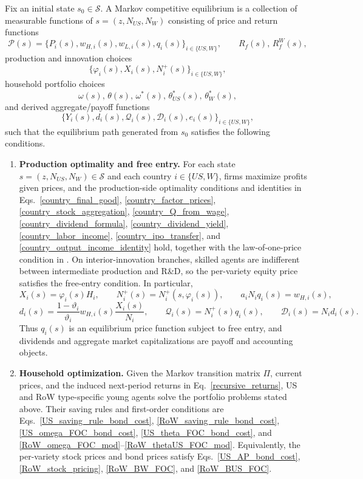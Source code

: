 \documentclass{article}
\begin{document}
\begin{defi}\label{def_recursive_equilibrium}
Fix an initial state $s_0\in\mathcal S$. A Markov competitive equilibrium is a collection of measurable functions of $s=(z,N_{US},N_W)$ consisting of price and return functions
\[
\mathcal P(s)=
\{P_i(s),w_{H,i}(s),w_{L,i}(s),q_i(s)\}_{i\in\{US,W\}},
\qquad
R_f(s),\,R_f^W(s),
\]
production and innovation choices
\[
\{\varphi_i(s),X_i(s),N_i^+(s)\}_{i\in\{US,W\}},
\]
household portfolio choices
\[
\omega(s),\,\theta(s),\,\omega^*(s),\,\theta_{US}^*(s),\,\theta_W^*(s),
\]
and derived aggregate/payoff functions
\[
\{Y_i(s),d_i(s),\mathcal Q_i(s),\mathcal D_i(s),e_i(s)\}_{i\in\{US,W\}},
\]
such that the equilibrium path generated from $s_0$ satisfies the following conditions.

\begin{enumerate}
    \item \textbf{Production optimality and free entry.} For each state $s=(z,N_{US},N_W)\in\mathcal S$ and each country $i\in\{US,W\}$, firms maximize profits given prices, and the production-side optimality conditions and identities in Eqs.~\eqref{country_final_good}, \eqref{country_factor_prices}, \eqref{country_stock_aggregation}, \eqref{country_Q_from_wage}, \eqref{country_dividend_formula}, \eqref{country_dividend_yield}, \eqref{country_labor_income}, \eqref{country_ipo_transfer}, and \eqref{country_output_income_identity} hold, together with the law-of-one-price condition in . On interior-innovation branches, skilled agents are indifferent between intermediate production and R\&D, so the per-variety equity price satisfies the free-entry condition. In particular,
    \[
    X_i(s)=\varphi_i(s)H_i,
    \qquad
    N_i^+(s)=N_i^+(s,\varphi_i(s)),
    \qquad
    a_iN_iq_i(s)=w_{H,i}(s),
    \]
    \[
    d_i(s)=
    \frac{1-\vartheta_i}{\vartheta_i}
    w_{H,i}(s)\frac{X_i(s)}{N_i},
    \qquad
    \mathcal Q_i(s)=N_i^+(s)q_i(s),
    \qquad
    \mathcal D_i(s)=N_id_i(s).
    \]
    Thus $q_i(s)$ is an equilibrium price function subject to free entry, and dividends and aggregate market capitalizations are payoff and accounting objects.

    \item \textbf{Household optimization.} Given the Markov transition matrix $\Pi$, current prices, and the induced next-period returns in Eq.~\eqref{recursive_returns}, US and RoW type-specific young agents solve the portfolio problems stated above. Their saving rules and first-order conditions are Eqs.~\eqref{US_saving_rule_bond_cost}, \eqref{RoW_saving_rule_bond_cost}, \eqref{US_omega_FOC_bond_cost}, \eqref{US_theta_FOC_bond_cost}, and \eqref{RoW_omega_FOC_mod}--\eqref{RoW_thetaUS_FOC_mod}. Equivalently, the per-variety stock prices and bond prices satisfy Eqs.~\eqref{US_AP_bond_cost}, \eqref{RoW_stock_pricing}, \eqref{RoW_BW_FOC}, and \eqref{RoW_BUS_FOC}.


\end{enumerate}
\end{defi}
\end{document}
